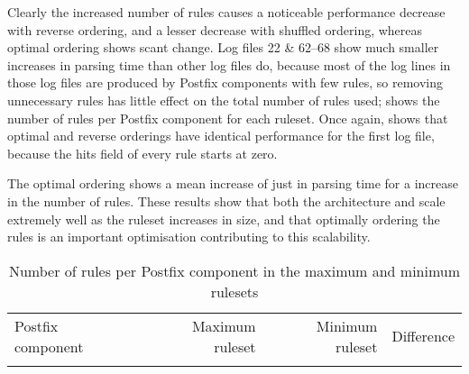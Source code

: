 Clearly the increased number of rules causes a noticeable performance
decrease with reverse ordering, and a lesser decrease with shuffled
ordering, whereas optimal ordering shows scant change.  Log files 22 \&
62--68 show much smaller increases in parsing time than other log files do,
because most of the log lines in those log files are produced by Postfix
components with few rules, so removing unnecessary rules has little effect
on the total number of rules used;  shows the number of rules
per Postfix component for each ruleset.  Once again,  shows that optimal and reverse orderings have identical
performance for the first log file, because the hits field of every rule
starts at zero.

The optimal ordering shows a mean increase of just
 in parsing time
for a \numberOFrulesMAXIMUMpercentage{} increase in the number of rules.
These results show that both the architecture and \parsername{} scale
extremely well as the ruleset increases in size, and that optimally
ordering the rules is an important optimisation contributing to this
scalability.



\begin{table}[thbp]
    \caption{Number of rules per Postfix component in the maximum and
    minimum rulesets}
    \empty{}\label{Number of rules per Postfix component in the maximum and
    minimum rulesets}
    \centering{}
    \begin{tabular}{lrrr}
        \tabletopline{}%
        Postfix component & Maximum ruleset & Minimum ruleset & Difference \\
        \tablemiddleline{}%
        
        \tablebottomline{}%
    \end{tabular}
\end{table}

